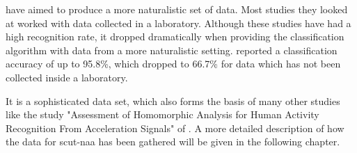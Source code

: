 \textcite[]{xue2010naturalistic} have aimed to produce a more naturalistic set of data. Most studies they looked at worked with data collected in a laboratory. Although these studies have had a high recognition rate, it dropped dramatically when providing the classification algorithm with data from a more naturalistic setting. \textcite[]{foerster1999detection} reported a classification accuracy of up to 95.8\%, which dropped to 66.7\% for data which has not been collected inside a laboratory.

It is a sophisticated data set, which also forms the basis of many other studies like the study "Assessment of Homomorphic Analysis for Human Activity Recognition From Acceleration Signals" of \textcite[]{vanrell2017assessment}. A more detailed description of how the data for \gls{scut-naa} has been gathered will be given in the following chapter.

